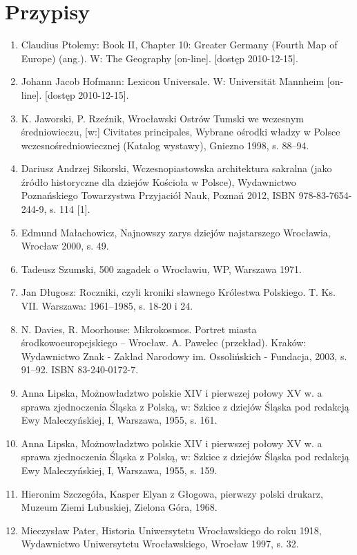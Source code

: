 \documentclass{article}
\begin{document}
\section{Przypisy}
\begin{enumerate}
\item Claudius Ptolemy: Book II, Chapter 10: Greater Germany (Fourth Map of Europe) (ang.). W: The Geography [on-line]. [dostęp 2010-12-15].\label{1}
\item Johann Jacob Hofmann: Lexicon Universale. W: Universität Mannheim [on-line]. [dostęp 2010-12-15].\label{2}
\item K. Jaworski, P. Rzeźnik, Wrocławski Ostrów Tumski we wczesnym średniowieczu, [w:] Civitates principales, Wybrane ośrodki władzy w Polsce wczesnośredniowiecznej (Katalog wystawy), Gniezno 1998, s. 88–94.\label{3}
\item Dariusz Andrzej Sikorski, Wczesnopiastowska architektura sakralna (jako źródło historyczne dla dziejów Kościoła w Polsce), Wydawnictwo Poznańskiego Towarzystwa Przyjaciół Nauk, Poznań 2012, ISBN 978-83-7654-244-9, s. 114 [1].\label{4}
\item Edmund Małachowicz, Najnowszy zarys dziejów najstarszego Wrocławia, Wrocław 2000, s. 49.\label{5}
\item Tadeusz Szumski, 500 zagadek o Wrocławiu, WP, Warszawa 1971.\label{6}
\item Jan Długosz: Roczniki, czyli kroniki sławnego Królestwa Polskiego. T. Ks. VII. Warszawa: 1961–1985, s. 18-20 i 24.\label{7}
\item N. Davies, R. Moorhouse: Mikrokosmos. Portret miasta środkowoeuropejskiego – Wrocław. A. Pawelec (przekład). Kraków: Wydawnictwo Znak - Zakład Narodowy im. Ossolińskich - Fundacja, 2003, s. 91–92. ISBN 83-240-0172-7. \label{8}
\item Anna Lipska, Możnowładztwo polskie XIV i pierwszej połowy XV w. a sprawa zjednoczenia Śląska z Polską, w: Szkice z dziejów Śląska pod redakcją Ewy Maleczyńskiej, I, Warszawa, 1955, s. 161.\label{9}
\item Anna Lipska, Możnowładztwo polskie XIV i pierwszej połowy XV w. a sprawa zjednoczenia Śląska z Polską, w: Szkice z dziejów Śląska pod redakcją Ewy Maleczyńskiej, I, Warszawa, 1955, s. 159.\label{10}
\item Hieronim Szczegóła, Kasper Elyan z Głogowa, pierwszy polski drukarz, Muzeum Ziemi Lubuskiej, Zielona Góra, 1968.\label{11}
\item Mieczysław Pater, Historia Uniwersytetu Wrocławskiego do roku 1918, Wydawnictwo Uniwersytetu Wrocławskiego, Wrocław 1997, s. 32.\label{12}

\end{enumerate}
\end{document}
